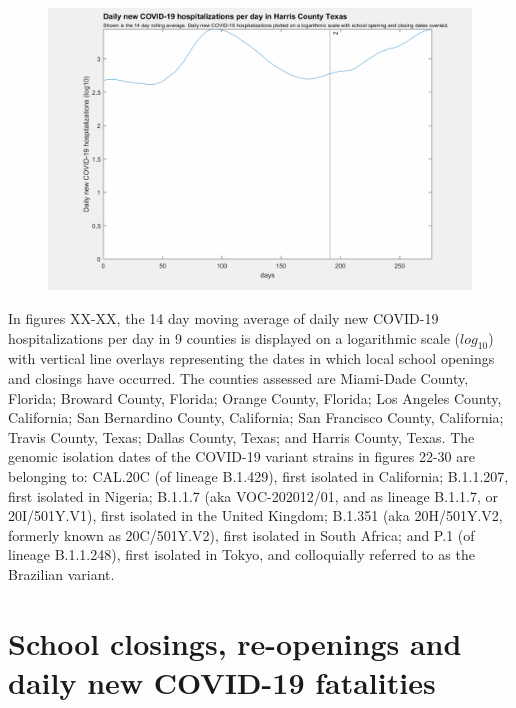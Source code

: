 \documentclass[]{article}
\begin{document}
\begin{figure}[!h]
	\includegraphics[width=\linewidth]{images/harris_hospitalizations_school_log.png}
	\caption{}
	\label{fig:images/harris_hospitalizations_school_logLabel}
\end{figure}

\FloatBarrier

In figures XX-XX, the 14 day moving average of daily new COVID-19 hospitalizations per day in 9 counties is displayed on a logarithmic scale ($log_{10}$) with vertical line overlays representing the dates in which local school openings and closings have occurred. The counties assessed are Miami-Dade County, Florida; Broward County, Florida; Orange County, Florida; Los Angeles County, California; San Bernardino County, California; San Francisco County, California; Travis County, Texas; Dallas County, Texas; and Harris County, Texas. The genomic isolation dates of the COVID-19 variant strains in figures 22-30 are belonging to: CAL.20C (of lineage B.1.429), first isolated in California; B.1.1.207, first isolated in Nigeria; B.1.1.7 (aka VOC-202012/01, and as lineage B.1.1.7, or 20I/501Y.V1), first isolated in the United Kingdom; B.1.351 (aka 20H/501Y.V2, formerly known as 20C/501Y.V2), first isolated in South Africa; and P.1 (of lineage B.1.1.248), first isolated in Tokyo, and colloquially referred to as the Brazilian variant.


\FloatBarrier
\vspace{5mm}
\section*{School closings, re-openings and daily new COVID-19 fatalities }
\end{document}
